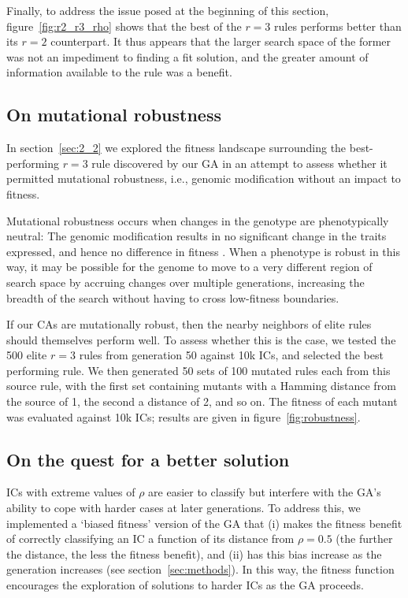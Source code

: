 Finally, to address the issue posed at the beginning of this section, figure~\ref{fig:r2_r3_rho} shows that the best of the $r = 3$ rules performs better than 
its $r = 2$ counterpart. It thus appears that the larger search space of the former was not an impediment to finding a fit solution, and the greater 
amount of information available to the rule was a benefit.

\subsection{On mutational robustness}

In section~\ref{sec:2_2} we explored the fitness landscape surrounding the best-performing $r = 3$ rule discovered by our GA in an attempt to 
assess whether it permitted mutational robustness, i.e., genomic modification without an impact to fitness.

Mutational robustness occurs when changes in the genotype are phenotypically neutral: The genomic modification results in no significant change 
in the traits expressed, and hence no difference in fitness \cite{wagner_role_2012}. When a phenotype is robust in this way, it may be possible for the 
genome to move to a very different region of search space by accruing changes over multiple generations, increasing the breadth of the search without 
having to cross low-fitness boundaries.

If our CAs are mutationally robust, then the nearby neighbors of elite rules should themselves perform well. To assess whether 
this is the case, we tested the 500 elite $r = 3$ rules from generation 50 against 10k ICs, and selected the best performing rule. 
We then generated 50 sets of 100 mutated rules each from this source rule, with the first set containing mutants with a Hamming distance from the 
source of 1, the second a distance of 2, and so on. The fitness of each mutant was evaluated against 10k ICs; results are given in 
figure~\ref{fig:robustness}.


\subsection{On the quest for a better solution}

ICs with extreme values of $\rho$ are easier to classify but interfere with the GA's ability to cope with harder cases at later generations. To address this, 
we implemented a `biased fitness' version of the GA that (i) makes the fitness benefit of correctly classifying an IC a function of its distance from 
$\rho = 0.5$ (the further the distance, the less the fitness benefit), and (ii) has this bias increase as the generation increases 
(see section~\ref{sec:methods}). In this way, the fitness function encourages the exploration of solutions to harder ICs as the GA proceeds.

